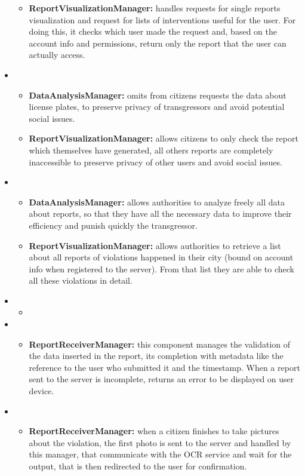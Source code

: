\begin{itemize}[label={}]
\begin{itemize}
		\item \textbf{ReportVisualizationManager:} handles requests for single reports visualization and request for lists of interventions useful for the user. For doing this, it checks which user made the request and, based on the account info and permissions, return only the report that the user can actually access. 
	\end{itemize}
	\item {}
	\begin{itemize}
		\item \textbf{DataAnalysisManager:} omits from citizens requests the data about license plates, to preserve privacy of transgressors and avoid potential social issues. 
		\item \textbf{ReportVisualizationManager:} allows citizens to only check the report which themselves have generated, all others reports are completely inaccessible to preserve privacy of other users and avoid social issues. 
	\end{itemize}
	\item {}
	\begin{itemize}
		\item \textbf{DataAnalysisManager:} allows authorities to analyze freely all data about reports, so that they have all the necessary data to improve their efficiency and punish quickly the transgressor.
		\item \textbf{ReportVisualizationManager:} allows authorities to retrieve a list about all reports of violations happened in their city (bound on account info when registered to the server). From that list they are able to check all these violations in detail. 
	\end{itemize}
	\item {}
	\begin{itemize}
		\item 
	\end{itemize}
	\item {}
	\begin{itemize}
		\item \textbf{ReportReceiverManager:} this component manages the validation of the data inserted in the report, its completion with metadata like the reference to the user who submitted it and the timestamp. When a report sent to the server is incomplete, returns an error to be displayed on user device.
	\end{itemize}
	\item {}
	\begin{itemize}
		\item \textbf{ReportReceiverManager:} when a citizen finishes to take pictures about the violation, the first photo is sent to the server and handled by this manager, that communicate with the OCR service and wait for the output, that is then redirected to the user for confirmation.
	\end{itemize}	
\end{itemize}

